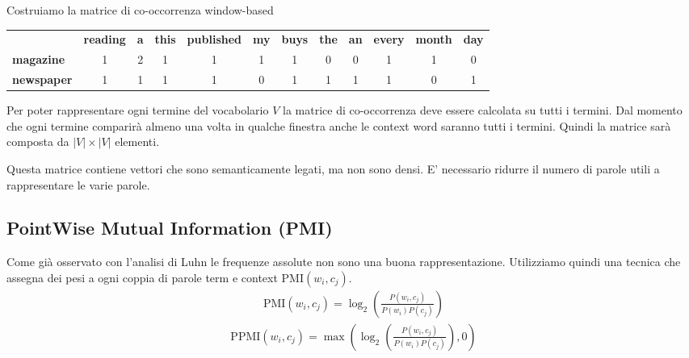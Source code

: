 Costruiamo la matrice di co-occorrenza window-based

{\setlength{\tabcolsep}{2.75pt}%
\begin{tabular}{l c c c c c c c c c c c}
                                   & {\color{teal} \textbf{reading}} & {\color{teal} \textbf{a}} & {\color{teal} \textbf{this}} & {\color{teal} \textbf{published}} & {\color{teal} \textbf{my}} & {\color{teal} \textbf{buys}} & {\color{teal} \textbf{the}} & {\color{teal} \textbf{an}} & {\color{teal} \textbf{every}} & {\color{teal} \textbf{month}} & {\color{teal} \textbf{day}} \\
  {\color{red} \textbf{magazine}}  & 1                               & 2                         & 1                            & 1                                 & 1                          & 1                            & 0                           & 0                          & 1                             & 1                             & 0                           \\
  {\color{red} \textbf{newspaper}} & 1                               & 1                         & 1                            & 1                                 & 0                          & 1                            & 1                           & 1                          & 1                             & 0                             & 1                           \\
\end{tabular}}
\bigskip

Per poter rappresentare ogni termine del vocabolario $V$ la matrice di co-occorrenza deve essere calcolata su tutti i termini.
Dal momento che ogni termine comparirà almeno una volta in qualche finestra anche le context word saranno tutti i termini.
Quindi la matrice sarà composta da $|V| \times |V|$ elementi.

Questa matrice contiene vettori che sono semanticamente legati, ma non sono densi.
E' necessario ridurre il numero di parole utili a rappresentare le varie parole.

\subsection*{PointWise Mutual Information (PMI)}
Come già osservato con l'analisi di Luhn le frequenze assolute non sono una buona rappresentazione.
Utilizziamo quindi una tecnica che assegna dei pesi a ogni coppia di parole term e context $\text{PMI}(w_i, c_j)$.
%
\begin{align*}
  \text{PMI}(w_i, c_j) = \log_2 \left(\frac{P(w_i, c_j)}{P(w_i)P(c_j)}\right)
\end{align*}
%
\begin{align*}
  \text{PPMI}(w_i, c_j) = \max\left(\log_2 \left(\frac{P(w_i, c_j)}{P(w_i)P(c_j)}\right), 0\right)
\end{align*}

